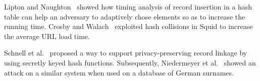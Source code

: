 
Lipton and Naughton~\cite{lipton1993clocked} showed how timing
analysis of record insertion in a hash table can help an adversary
to adaptively chose elements so as to increase the running time.
Crosby and Walach~\cite{crosby2003denial} exploited hash collisions
in Squid to increase the average URL load time.

Schnell et al.~\cite{schnell2011novel} proposed a way to support
privacy-preserving record linkage by using secretly keyed hash
functions. Subsequently, Niedermeyer et
al.~\cite{niedermeyer2014cryptanalysis} showed an attack on a
similar system when used on a database of German surnames.
